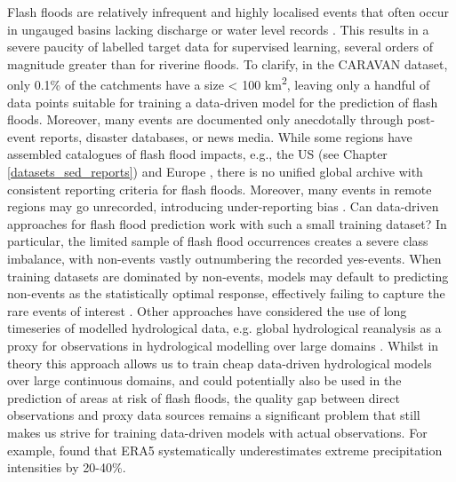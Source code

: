 Flash  floods are relatively infrequent and highly localised events that often occur in ungauged basins lacking discharge or water level records \citep{Gaume_2009}. This results in a severe paucity of labelled target data for supervised learning, several orders of magnitude greater than for riverine floods. To clarify, in the CARAVAN dataset, only 0.1\% of the catchments have a size < 100 km\textsuperscript{2}, leaving only a handful of data points suitable for training a data-driven model for the prediction of flash floods. Moreover, many events are documented only anecdotally through post-event reports, disaster databases, or news media. While some regions have assembled catalogues of flash flood impacts, e.g., the US (see Chapter \ref{datasets_sed_reports}) and Europe \citep{Dotzek_2009}, there is no unified global archive with consistent reporting criteria for flash floods. Moreover, many events in remote regions may go unrecorded, introducing under-reporting bias \citep{Panwar_2020, Marsigli_2021}. Can data-driven approaches for flash flood prediction work with such a small training dataset? In particular, the limited sample of flash flood occurrences creates a severe class imbalance, with non-events vastly outnumbering the recorded yes-events. When training datasets are dominated by non-events, models may default to predicting non-events as the statistically optimal response, effectively failing to capture the rare events of interest \citep{Kaur_2019}. Other approaches have considered the use of long timeseries of modelled hydrological data, e.g. global hydrological reanalysis \citep{Harrigan_2020} as a proxy for observations in hydrological modelling over large domains \citep{Prudhomme_2024}. Whilst in theory this approach allows us to train cheap data-driven hydrological models over large continuous domains, and could potentially also be used in the prediction of areas at risk of flash floods, the quality gap between direct observations and proxy data sources remains a significant problem that still makes us strive for training data-driven models with actual observations. For example, \citet{Zsoter_2019} found that ERA5 systematically underestimates extreme precipitation intensities by 20-40\%.

